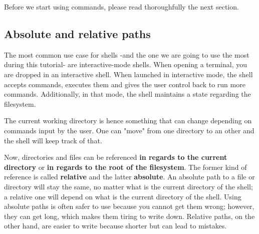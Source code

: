 \documentclass[12pt]{article}
\begin{document}
Before we start using commands, please read thoroughfully the next section.

\subsection{Absolute and relative paths}

The most common use case for shells -and the one we are going to use the most during this tutorial- are interactive-mode shells. When opening a terminal, you are dropped in an interactive shell. When launched in interactive mode, the shell accepts commands, executes them and gives the user control back to run more commands. Additionally, in that mode, the shell maintains a state regarding the filesystem.

The current working directory is hence something that can change depending on commands input by the user. One can "move" from one directory to an other and the shell will keep track of that.

Now, directories and files can be referenced \textbf{in regards to the current directory} or \textbf{in regards to the root of the filesystem}. The former kind of reference is called \textbf{relative} and the latter \textbf{absolute}. An absolute path to a file or directory will stay the same, no matter what is the current directory of the shell; a relative one will depend on what is the current directory of the shell. Using absolute paths is often safer to use because you cannot get them wrong; however, they can get long, which makes them tiring to write down. Relative paths, on the other hand, are easier to write because shorter but can lead to mistakes. \newline

\usetikzlibrary{trees,calc}
\end{document}
